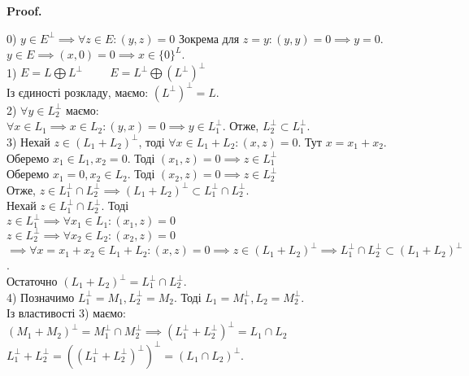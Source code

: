 \documentclass[a4paper, 10pt]{article}
\makeatletter
\theoremstyle{theoremdd}
\renewenvironment{proof}[1][Proof.\\]{\par
\pushQED{\hfill \qed}%
\normalfont \topsep6\p@\@plus6\p@\relax
\trivlist
\item\relax
{\bfseries
#1\@addpunct{.}}\hspace\labelsep\ignorespaces
}{%
\popQED\endtrivlist\@endpefalse
}
\makeatother
\begin{document}
\begin{proof}
0) $y \in E^{\perp} \implies \forall z \in E: (y,z) = 0$ Зокрема для $z = y: (y,y) = 0 \implies y = 0$.\\
$y \in E \implies (x,0) = 0 \implies x \in \{0\}^L$.
\bigskip \\
1) $E = L \bigoplus L^{\perp} \hspace{1cm} E = L^{\perp} \bigoplus (L^{\perp})^{\perp}$\\
Із єдиності розкладу, маємо: $(L^{\perp})^{\perp} = L$.
\bigskip \\
2) $\forall y \in L_2^{\perp}$ маємо:\\
$\forall x \in L_1 \implies x \in L_2: (y,x) = 0 \implies y \in L_1^{\perp}$. Отже, $L_2^{\perp} \subset L_1^{\perp}$.
\bigskip \\

3) Нехай $z \in (L_1+L_2)^\perp$, тоді $\forall x \in L_1+L_2: (x,z) = 0$. Тут $x = x_1 + x_2$. \\
Оберемо $x_1 \in L_1, x_2 = 0$. Тоді $(x_1,z) = 0 \implies z \in L_1^\perp$\\
Оберемо $x_1 = 0, x_2 \in L_2$. Тоді $(x_2,z) = 0 \implies z \in L_2^\perp$\\
Отже, $z \in L_1^\perp \cap L_2^\perp \implies (L_1+L_2)^\perp \subset L_1^\perp \cap L_2^\perp$.\\
Нехай $z \in L_1^\perp \cap L_2^\perp$. Тоді\\
$z \in L_1^\perp \implies \forall x_1 \in L_1: (x_1,z) = 0$\\
$z \in L_2^\perp \implies \forall x_2 \in L_2: (x_2,z) = 0$\\
$\implies \forall x = x_1+x_2 \in L_1+L_2: (x,z) = 0 \implies z \in (L_1+L_2)^\perp \implies L_1^\perp \cap L_2^\perp \subset (L_1+L_2)^\perp$.\\
Остаточно $(L_1+L_2)^{\perp} = L_1^{\perp} \cap L_2^{\perp}$.
\bigskip \\

\iffalse
3) $\forall z \in (L_1+L_2)^{\perp}: \forall x \in L_1, y \in L_2: x+y \in L_1+L_2: (z,x+y) = 0$\\
Тому $(z,x+y) = 0 \iff \begin{cases} (z,x) = 0 \\ (z,y) = 0 \end{cases} \iff \begin{cases} z \in L_1^{\perp} \\ z \in L_2^{\perp} \end{cases} \iff z \in L_1^{\perp} \cap L_2^{\perp}$
\fi

4) Позначимо $L_1^{\perp} = M_1, L_2^{\perp} = M_2$. Тоді $L_1 = M_1^{\perp}, L_2 = M_2^{\perp}$.\\
Із властивості 3) маємо:\\
$(M_1+M_2)^{\perp} = M_1^{\perp} \cap M_2^{\perp} \implies (L_1^{\perp} + L_2^{\perp})^{\perp} = L_1 \cap L_2$\\
$L_1^{\perp} + L_2^{\perp}=((L_1^{\perp} + L_2^{\perp})^{\perp})^{\perp} = (L_1 \cap L_2)^{\perp}$.
\end{proof}
\end{document}
